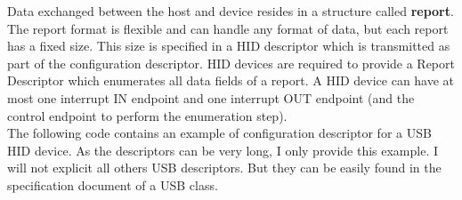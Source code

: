\documentclass[pdftex,10pt,a4paper]{report}
\begin{document}
Data exchanged between the host and device resides in a structure called \textbf{report}. The report format is flexible and can handle any format of data, but each report has a fixed size. This size is specified in a HID descriptor which is transmitted as part of the configuration descriptor.
HID devices are required to provide a Report Descriptor which enumerates all data fields of a report. A HID device can have at most one interrupt IN endpoint and one interrupt OUT endpoint (and the control endpoint to perform the enumeration step).
\\

The following code contains an example of configuration descriptor for a USB HID device. As the descriptors can be very long, I only provide this example. I will not explicit all others USB descriptors. But they can be easily found in the specification document of a USB class.
\end{document}
